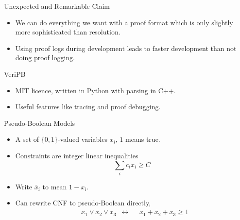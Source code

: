 \documentclass{beamer}
\begin{document}
\begin{frame}[fragile]{Unexpected and Remarkable Claim}
    \begin{itemize}
        \item We can do everything we want with a proof format which is only slightly more
            sophisticated than resolution.
        \item <2-> Using proof logs during development leads to faster development than not doing proof logging.
    \end{itemize}
\end{frame}

\begin{frame}{VeriPB}
    \begin{center}
        \bigskip
    \end{center}
    \begin{itemize}
        \item MIT licence, written in Python with parsing in C++.
        \item Useful features like tracing and proof debugging.
    \end{itemize}
\end{frame}

\begin{frame}{Pseudo-Boolean Models}
    \begin{itemize}
        \item A set of $\{ 0, 1 \}$-valued variables $x_i$, $1$ means true.
        \item Constraints are integer linear inequalities \[
                \sum_i c_i x_i \ge C
            \]
        \item Write $\overline{x}_i$ to mean $1 - x_i$.
        \item Can rewrite CNF to pseudo-Boolean directly, \begin{align*}
                & x_1 \vee \overline{x}_2 \vee x_3 & \leftrightarrow && x_1 + \overline{x}_2 + x_3 \ge 1
        \end{align*}
    \end{itemize}
\end{frame}
\end{document}

